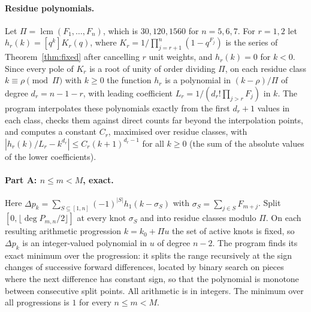 \documentclass[11pt,a4paper]{article}
\theoremstyle{definition}\newtheorem{definition}[theorem]{Definition}
\theoremstyle{remark}\newtheorem{remark}[theorem]{Remark}\newtheorem{example}[theorem]{Example}
\numberwithin{equation}{section}
\begin{document}
\paragraph{Residue polynomials.} Let $\Pi=\operatorname{lcm}(F_1,\ldots,F_n)$, which is $30,120,1560$ for $n=5,6,7$. For $r=1,2$ let $h_r(k)=[q^k]K_r(q)$, where $K_r=1/\prod_{j=r+1}^n(1-q^{F_j})$ is the series of Theorem~\ref{thm:fixed} after cancelling $r$ unit weights, and $h_r(k)=0$ for $k<0$. Since every pole of $K_r$ is a root of unity of order dividing $\Pi$, on each residue class $k\equiv\rho\pmod\Pi$ with $k\ge0$ the function $h_r$ is a polynomial in $(k-\rho)/\Pi$ of degree $d_r=n-1-r$, with leading coefficient $L_r=1/(d_r!\prod_{j>r}F_j)$ in $k$. The program interpolates these polynomials exactly from the first $d_r+1$ values in each class, checks them against direct counts far beyond the interpolation points, and computes a constant $C_r$, maximised over residue classes, with $|h_r(k)/L_r-k^{d_r}|\le C_r(k+1)^{d_r-1}$ for all $k\ge0$ (the sum of the absolute values of the lower coefficients).

\paragraph{Part A: $n\le m<M$, exact.} Here $\Delta p_k=\sum_{S\subseteq[1,n]}(-1)^{|S|}h_1(k-\sigma_S)$ with $\sigma_S=\sum_{j\in S}F_{m+j}$. Split $[0,\lfloor\deg P_{m,n}/2\rfloor]$ at every knot $\sigma_S$ and into residue classes modulo $\Pi$. On each resulting arithmetic progression $k=k_0+\Pi u$ the set of active knots is fixed, so $\Delta p_k$ is an integer-valued polynomial in $u$ of degree $n-2$. The program finds its exact minimum over the progression: it splits the range recursively at the sign changes of successive forward differences, located by binary search on pieces where the next difference has constant sign, so that the polynomial is monotone between consecutive split points. All arithmetic is in integers. The minimum over all progressions is $1$ for every $n\le m<M$.
\end{document}
